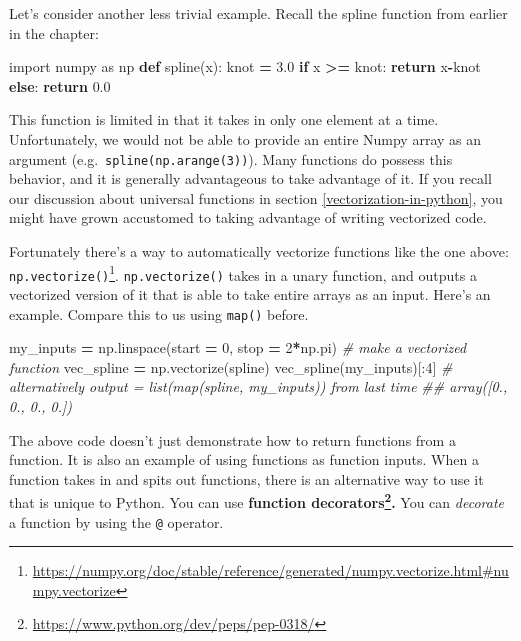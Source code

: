 \documentclass[
  12pt,
  krantz2]{krantz}
\makeatletter
\newenvironment{Shaded}{\begin{snugshade}}{\end{snugshade}}
\newcommand{\CommentTok}[1]{\textcolor[rgb]{0.37,0.37,0.37}{\textit{#1}}}
\newcommand{\ControlFlowTok}[1]{\textcolor[rgb]{0.27,0.27,0.27}{\textbf{#1}}}
\newcommand{\DecValTok}[1]{\textcolor[rgb]{0.06,0.06,0.06}{#1}}
\newcommand{\FloatTok}[1]{\textcolor[rgb]{0.06,0.06,0.06}{#1}}
\newcommand{\ImportTok}[1]{#1}
\newcommand{\KeywordTok}[1]{\textcolor[rgb]{0.27,0.27,0.27}{\textbf{#1}}}
\newcommand{\NormalTok}[1]{#1}
\newcommand{\OperatorTok}[1]{\textcolor[rgb]{0.43,0.43,0.43}{\textbf{#1}}}
\renewcommand{\href}[2]{#2\footnote{\url{#1}}}
\newenvironment{kframe}{%
\medskip{}
\setlength{\fboxsep}{.8em}
 \def\at@end@of@kframe{}%
 \ifinner\ifhmode%
  \def\at@end@of@kframe{\end{minipage}}%
  \begin{minipage}{\columnwidth}%
 \fi\fi%
 \def\FrameCommand##1{\hskip\@totalleftmargin \hskip-\fboxsep
 \colorbox{shadecolor}{##1}\hskip-\fboxsep
     \hskip-\linewidth \hskip-\@totalleftmargin \hskip\columnwidth}%
 \MakeFramed {\advance\hsize-\width
   \@totalleftmargin\z@ \linewidth\hsize
   \@setminipage}}%
 {\par\unskip\endMakeFramed%
 \at@end@of@kframe}
\renewenvironment{Shaded}{\begin{kframe}}{\end{kframe}}
\makeatother
\begin{document}
Let's consider another less trivial example. Recall the spline function from earlier in the chapter:

\begin{Shaded}
\begin{Highlighting}[]
\ImportTok{import}\NormalTok{ numpy }\ImportTok{as}\NormalTok{ np}
\KeywordTok{def}\NormalTok{ spline(x):}
\NormalTok{    knot }\OperatorTok{=} \FloatTok{3.0}
    \ControlFlowTok{if}\NormalTok{ x }\OperatorTok{\textgreater{}=}\NormalTok{ knot:}
        \ControlFlowTok{return}\NormalTok{ x}\OperatorTok{{-}}\NormalTok{knot}
    \ControlFlowTok{else}\NormalTok{:}
        \ControlFlowTok{return} \FloatTok{0.0}
\end{Highlighting}
\end{Shaded}

This function is limited in that it takes in only one element at a time. Unfortunately, we would not be able to provide an entire Numpy array as an argument (e.g.~\texttt{spline(np.arange(3))}). Many functions do possess this behavior, and it is generally advantageous to take advantage of it. If you recall our discussion about universal functions in section \ref{vectorization-in-python}, you might have grown accustomed to taking advantage of writing vectorized code.

Fortunately there's a way to automatically vectorize functions like the one above: \href{https://numpy.org/doc/stable/reference/generated/numpy.vectorize.html\#numpy.vectorize}{\texttt{np.vectorize()}}. \texttt{np.vectorize()} takes in a unary function, and outputs a vectorized version of it that is able to take entire arrays as an input. Here's an example. Compare this to us using \texttt{map()} before.

\begin{Shaded}
\begin{Highlighting}[]
\NormalTok{my\_inputs }\OperatorTok{=}\NormalTok{ np.linspace(start }\OperatorTok{=} \DecValTok{0}\NormalTok{, stop }\OperatorTok{=} \DecValTok{2}\OperatorTok{*}\NormalTok{np.pi)}
\CommentTok{\# make a vectorized function}
\NormalTok{vec\_spline }\OperatorTok{=}\NormalTok{ np.vectorize(spline) }
\NormalTok{vec\_spline(my\_inputs)[:}\DecValTok{4}\NormalTok{]}
\CommentTok{\# alternatively output = list(map(spline, my\_inputs)) from last time}
\CommentTok{\#\# array([0., 0., 0., 0.])}
\end{Highlighting}
\end{Shaded}

The above code doesn't just demonstrate how to return functions from a function. It is also an example of using functions as function inputs. When a function takes in and spits out functions, there is an alternative way to use it that is unique to Python. You can use \textbf{\href{https://www.python.org/dev/peps/pep-0318/}{function decorators}.} You can \emph{decorate} a function by using the \texttt{@} operator.
\end{document}
